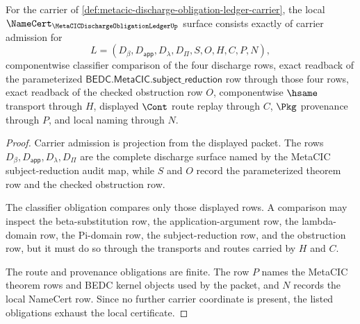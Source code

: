 \begin{theorem}
\label{thm:metacic-discharge-obligation-ledger-namecert-obligations}
For the carrier of \autoref{def:metacic-discharge-obligation-ledger-carrier}, the local $\NameCert_{\MetaCICDischargeObligationLedgerUp}$ surface consists exactly of carrier admission for
$$
L=(D_\beta,D_{\mathsf{app}},D_\lambda,D_\Pi,S,O,H,C,P,N),
$$
componentwise classifier comparison of the four discharge rows, exact readback of the parameterized $\mathsf{BEDC.MetaCIC.subject\_reduction}$ row through those four rows, exact readback of the checked obstruction row $O$, componentwise $\hsame$ transport through $H$, displayed $\Cont$ route replay through $C$, $\Pkg$ provenance through $P$, and local naming through $N$.
\end{theorem}
\begin{proof}
Carrier admission is projection from the displayed packet. The rows $D_\beta,D_{\mathsf{app}},D_\lambda,D_\Pi$ are the complete discharge surface named by the MetaCIC subject-reduction audit map, while $S$ and $O$ record the parameterized theorem row and the checked obstruction row.

The classifier obligation compares only those displayed rows. A comparison may inspect the beta-substitution row, the application-argument row, the lambda-domain row, the Pi-domain row, the subject-reduction row, and the obstruction row, but it must do so through the transports and routes carried by $H$ and $C$.

The route and provenance obligations are finite. The row $P$ names the MetaCIC theorem rows and BEDC kernel objects used by the packet, and $N$ records the local NameCert row. Since no further carrier coordinate is present, the listed obligations exhaust the local certificate.
\end{proof}

